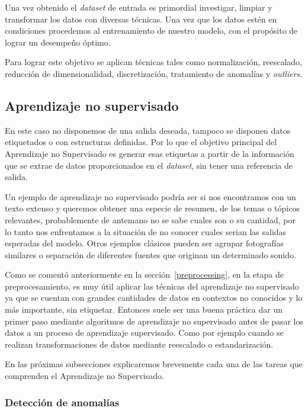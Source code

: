 \documentclass[a4paper,12pt]{article}
\begin{document}
Una vez obtenido el \textit{dataset} de entrada es primordial investigar, limpiar y transformar los datos con diversas técnicas. Una vez que los datos estén en condiciones procedemos al entrenamiento de nuestro modelo, con el propósito de lograr un desempeño óptimo.

Para lograr este objetivo se aplican técnicas tales como normalización, reescalado, reducción de dimensionalidad, discretización, tratamiento de anomalías y \textit{outliers}.

\subsection{Aprendizaje no supervisado} \label{unsupervised}

En este caso no disponemos de una salida deseada, tampoco se disponen datos etiquetados o con estructuras definidas. Por lo que el objetivo principal del Aprendizaje no Supervisado es generar esas etiquetas a partir de la información que se extrae de datos proporcionados en el \textit{dataset}, sin tener una referencia de salida.

Un ejemplo de aprendizaje no supervisado podría ser si nos encontramos con un texto extenso y queremos obtener una especie de resumen, de los temas o tópicos relevantes, probablemente de antemano no se sabe cuales son o su cantidad, por lo tanto nos enfrentamos a la situación de no conocer cuales serian las salidas esperadas del modelo. 
Otros ejemplos clásicos pueden ser agrupar fotografías similares o separación de diferentes fuentes que originan un determinado sonido. 

Como se comentó anteriormente en la sección~\ref{preprocessing}, en la etapa de preprocesamiento, es muy útil aplicar las técnicas del aprendizaje no supervisado ya que se cuentan con grandes cantidades de datos en contextos no conocidos y lo más importante, sin etiquetar. Entonces suele ser una buena práctica dar un primer paso mediante algoritmos de aprendizaje no supervisado antes de pasar los datos a un proceso de aprendizaje supervisado. Como por ejemplo cuando se realizan transformaciones de datos mediante reescalado o estandarización. 

En las próximas subsecciones explicaremos brevemente cada una de las tareas que comprenden el Aprendizaje no Supervisado.

\subsubsection{Detección de anomalías}
\end{document}
